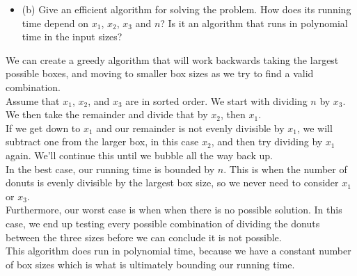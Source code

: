 \documentclass{article}
\begin{document}
\begin{enumerate}
\begin{itemize}
    \item (b) Give an efficient algorithm for solving the problem. How does its running time depend on $x_1$, $x_2$, $x_3$ and $n$? Is it an algorithm that runs in polynomial time in the input sizes? 
\end{itemize}
We can create a greedy algorithm that will work backwards taking the largest possible boxes, and moving to smaller box sizes as we try to find a valid combination. \\
\newline
Assume that $x_1$, $x_2$, and $x_3$ are in sorted order. We start with dividing $n$ by $x_3$. We then take the remainder and divide that by $x_2$, then $x_1$. \\
\newline
If we get down to $x_1$ and our remainder is not evenly divisible by $x_1$, we will subtract one from the larger box, in this case $x_2$, and then try dividing by $x_1$ again. We'll continue this until we bubble all the way back up. \\
\newline 
In the best case, our running time is bounded by $n$. This is when the number of donuts is evenly divisible by the largest box size, so we never need to consider $x_1$ or $x_3$. \\

Furthermore, our worst case is when when there is no possible solution. In this case, we end up testing every possible combination of dividing the donuts between the three sizes before we can conclude it is not possible. \\
\newline 
This algorithm does run in polynomial time, because we have a constant number of box sizes which is what is ultimately bounding our running time.











\end{enumerate}
\end{document}
